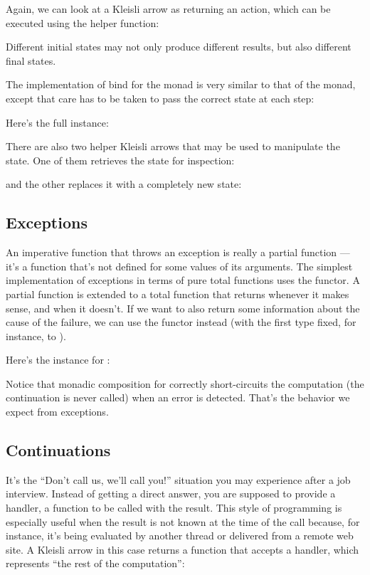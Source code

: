 Again, we can look at a Kleisli arrow as returning an action, which can
be executed using the helper function:

Different initial states may not only produce different results, but
also different final states.

The implementation of bind for the  monad is very similar
to that of the  monad, except that care has to be taken
to pass the correct state at each step:

Here's the full instance:

There are also two helper Kleisli arrows that may be used to manipulate
the state. One of them retrieves the state for inspection:

and the other replaces it with a completely new state:


\subsection{Exceptions}

An imperative function that throws an exception is really a partial
function --- it's a function that's not defined for some values of its
arguments. The simplest implementation of exceptions in terms of pure
total functions uses the  functor. A partial function is
extended to a total function that returns  whenever it
makes sense, and  when it doesn't. If we want to also
return some information about the cause of the failure, we can use the
 functor instead (with the first type fixed, for
instance, to ).

Here's the  instance for :

Notice that monadic composition for  correctly
short-circuits the computation (the continuation  is never
called) when an error is detected. That's the behavior we expect from
exceptions.

\subsection{Continuations}

It's the ``Don't call us, we'll call you!'' situation you may experience
after a job interview. Instead of getting a direct answer, you are
supposed to provide a handler, a function to be called with the result.
This style of programming is especially useful when the result is not
known at the time of the call because, for instance, it's being
evaluated by another thread or delivered from a remote web site. A
Kleisli arrow in this case returns a function that accepts a handler,
which represents ``the rest of the computation'':

